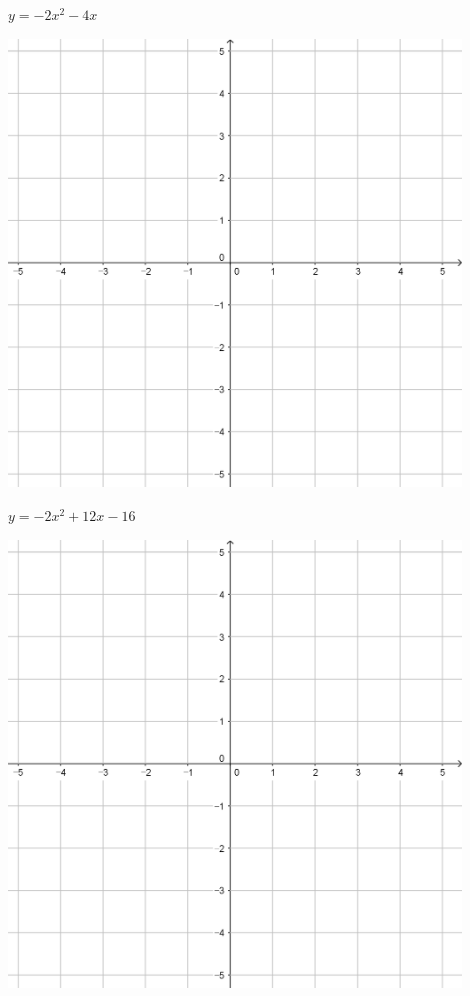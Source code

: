 \documentclass[a4paper]{oblivoir}
\begin{document}
\clearpage
\begin{minipage}{0.45\textwidth}\centering
\(y=-2x^2-4x\)
\par\bigskip\includegraphics[width=0.9\textwidth]{55}
\end{minipage}
\begin{minipage}{0.45\textwidth}\centering
\(y=-2x^2+12x-16\)
\par\bigskip\includegraphics[width=0.9\textwidth]{55}
\end{minipage}\bigskip\bigskip\par
\end{document}
